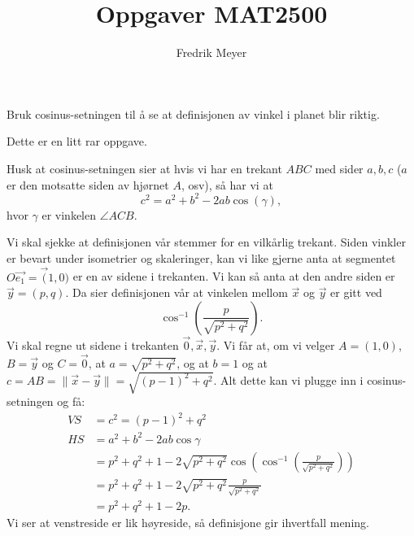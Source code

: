 \documentclass[11pt, norsk]{article}
\begin{document}
\title{Oppgaver MAT2500}
\author{Fredrik Meyer}
\maketitle 

\begin{oppg}
Bruk cosinus-setningen til å se at definisjonen av vinkel i planet blir riktig.
\end{oppg}
\begin{losn}
Dette er en litt rar oppgave.

Husk at cosinus-setningen sier at hvis vi har en trekant $ABC$ med sider $a,b,c$ ($a$ er den motsatte siden av hjørnet $A$, osv), så har vi at 
\[
c^2 = a^2+b^2-2ab \cos (\gamma),
\]
hvor $\gamma$ er vinkelen $\angle ACB$.

Vi skal sjekke at definisjonen vår stemmer for en vilkårlig trekant. Siden vinkler er bevart under isometrier og skaleringer, kan vi like gjerne anta at segmentet $O\vec{e_1}=\vec (1,0)$ er en av sidene i trekanten. Vi kan så anta at den andre siden er $\vec y = (p,q)$. Da sier definisjonen vår at vinkelen mellom $\vec x$ og $\vec y$ er gitt ved 
\[
\cos ^{-1}\left( \frac{p}{\sqrt{p^2+q^2}} \right).
\]
Vi skal regne ut sidene i trekanten $\vec 0, \vec x, \vec y$. Vi får at, om vi velger $A=(1,0)$, $B=\vec y$ og $C=\vec 0$, at $a=\sqrt{p^2+q^2}$, og at $b=1$ og at $c=AB=\| \vec x - \vec y \|=\sqrt{(p-1)^2+q^2}$. Alt dette kan vi plugge inn i cosinus-setningen og få:
\begin{align*}
VS &= c^2 = (p-1)^2+q^2 \\
HS &= a^2+b^2-2ab \cos \gamma \\
&= p^2+q^2+1-2\sqrt{p^2+q^2}\cos \left( \cos^{-1}\left( \frac{p}{\sqrt{p^2+q^2}} \right)\right) \\
&= p^2+q^2+1-2\sqrt{p^2+q^2} \frac{p}{\sqrt{p^2+q^2}} \\
&= p^2+q^2+1-2p.
\end{align*}
Vi ser at venstreside er lik høyreside, så definisjone gir ihvertfall mening.
\end{losn}
\end{document}
